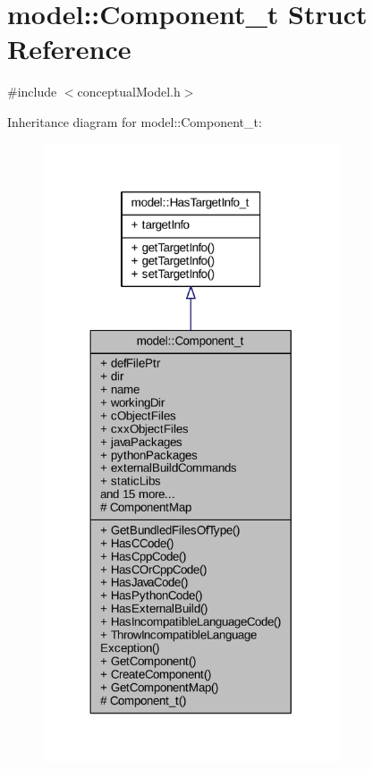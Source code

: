 \hypertarget{structmodel_1_1_component__t}{}\section{model\+:\+:Component\+\_\+t Struct Reference}
\label{structmodel_1_1_component__t}


{\ttfamily \#include $<$conceptual\+Model.\+h$>$}



Inheritance diagram for model\+:\+:Component\+\_\+t\+:
\nopagebreak
\begin{figure}[H]
\begin{center}
\leavevmode
\includegraphics[width=248pt]{structmodel_1_1_component__t__inherit__graph}
\end{center}
\end{figure}


